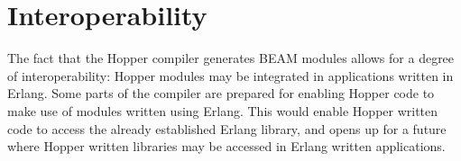 \section{Interoperability}


The fact that the Hopper compiler generates BEAM modules allows for a degree of interoperability: Hopper modules may be integrated in applications written in Erlang. Some parts of the compiler are prepared for enabling Hopper code to make use of modules written using Erlang. This would enable Hopper written code to access the already established Erlang library, and opens up for a future where Hopper written libraries may be accessed in Erlang written applications.